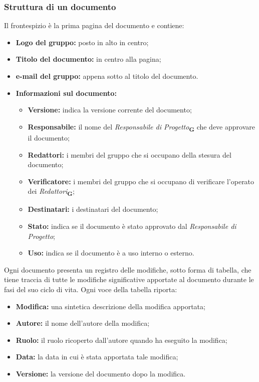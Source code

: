 \subsubsection{Struttura di un documento}
Il frontespizio è la prima pagina del documento e contiene:
\begin{itemize}
    \item \textbf{Logo del gruppo:} posto in alto in centro;
    \item \textbf{Titolo del documento:} in centro alla pagina;
    \item \textbf{e-mail del gruppo:} appena sotto al titolo del documento.
    \item \textbf{Informazioni sul documento:}
          \begin{itemize}
              \item \textbf{Versione:} indica la versione corrente del documento;
              \item \textbf{Responsabile:} il nome del \textit{Responsabile di Progetto}\textsubscript{\textbf{G}} che deve approvare il documento;
              \item \textbf{Redattori:} i membri del gruppo che si occupano della stesura del documento;
              \item \textbf{Verificatore:} i membri del gruppo che si occupano di verificare l'operato dei \textit{Redattori}\textsubscript{\textbf{G}};
              \item \textbf{Destinatari:} i destinatari del documento;
              \item \textbf{Stato:} indica se il documento è stato approvato dal \textit{Responsabile di Progetto};
              \item \textbf{Uso:} indica se il documento è a uso interno o esterno.
          \end{itemize}
\end{itemize}
Ogni documento presenta un registro delle modifiche, sotto forma di tabella, che tiene traccia di tutte le modifiche significative apportate al documento durante le fasi del suo ciclo di vita. Ogni voce della tabella riporta:
\begin{itemize}
    \item \textbf{Modifica:} una sintetica descrizione della modifica apportata;
    \item \textbf{Autore:} il nome dell'autore della modifica;
    \item \textbf{Ruolo:} il ruolo ricoperto dall'autore quando ha eseguito la modifica;
    \item \textbf{Data:} la data in cui è stata apportata tale modifica;
    \item \textbf{Versione:} la versione del documento dopo la modifica.
\end{itemize}

